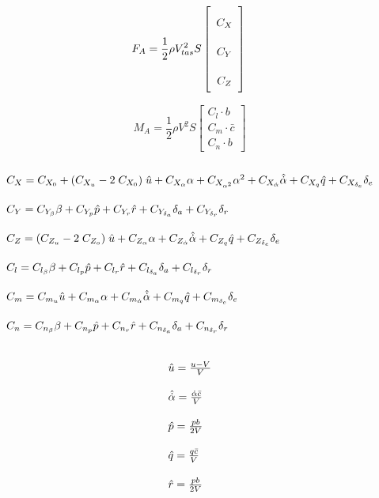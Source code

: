 \begin{equation}
\label{eq:f_a}
{F_A} = \frac{1}{2}\rho V_{tas}^2S\left[ {\begin{array}{*{20}{c}}
{{C_X}}\\
{{C_Y}}\\
{{C_Z}}
\end{array}} \right]\\
\end{equation}

\begin{equation}
\label{eq:m_a}
{M_A} = \frac{1}{2}\rho {V^2}S\left[ {\begin{array}{*{20}{c}}
{{C_l} \cdot b}\\
{{C_m} \cdot \bar c}\\
{{C_n} \cdot b}
\end{array}} \right]
\end{equation}

\begin{equation}
\label{eq:body_coefs}
\arraycolsep=1.4pt\def\arraystretch{2.2}
\begin{array}{l}
{C_X} = C_{{X_0}} + ({C_{{X_u}}} - 2\;{C_{{X_0}}})\;\hat u + {C_{{X_\alpha }}}\alpha  + {C_{{X_{{\alpha ^2}}}}}{\alpha ^2} + C_{{X_{\dot{\alpha}}}}\hat{\dot{\alpha}}  + {C_{{X_q}}}\hat q + {C_{{X_{{\delta _e}}}}}{\delta _e}\\
{C_Y} = {C_{{Y_\beta }}}\beta  + {C_{{Y_p}}}\hat p + {C_{{Y_r}}}\hat r + {C_{{Y_{{\delta _a}}}}}{\delta _a} + {C_{{Y_{{\delta _r}}}}}{\delta _r}\\
{C_Z} = ({C_{{Z_u}}} - 2\;{C_{{Z_o}}})\;\hat u + {C_{{Z_\alpha }}}\alpha  + {C_{{Z_{\dot{\alpha}}}}\hat{\dot{\alpha}} + {C_{{Z_q}}}\hat q + C_{{Z_{{\delta _e}}}}}{\delta _e}\\
{C_l} = {C_{{l_\beta }}}\beta  + {C_{{l_p}}}\hat p + {C_{{l_r}}}\hat r + {C_{{l_{{\delta _a}}}}}{\delta _a} + {C_{{l_{{\delta _r}}}}}{\delta _r}\\
{C_m} = {C_{{m_u}}}\hat u + {C_{{m_\alpha }}}\alpha  + C_{{m_{\dot{\alpha}}}}\hat{\dot{\alpha}}  + {C_{{m_q}}}\hat q + {C_{{m_{{\delta _e}}}}}{\delta _e}\\
{C_n} = {C_{{n_\beta }}}\beta  + {C_{{n_p}}}\hat p + {C_{{n_r}}}\hat r + {C_{{n_{{\delta _a}}}}}{\delta _a} + {C_{{n_{{\delta _r}}}}}{\delta _r}
\end{array}
\end{equation}

\begin{equation}
\label{eq:dim_less_rates}
\arraycolsep=1.4pt\def\arraystretch{2.2}
\begin{array}{l}
\hat u = \frac{{u - V}}{V}\\
\hat{\dot{\alpha}} = \frac{\dot{\alpha}\bar{c}}{V}\\
\hat p = \frac{{pb}}{{2V}}\\
\hat q = \frac{{q\bar c}}{V}\\
\hat r = \frac{{pb}}{{2V}}
\end{array}
\end{equation}

